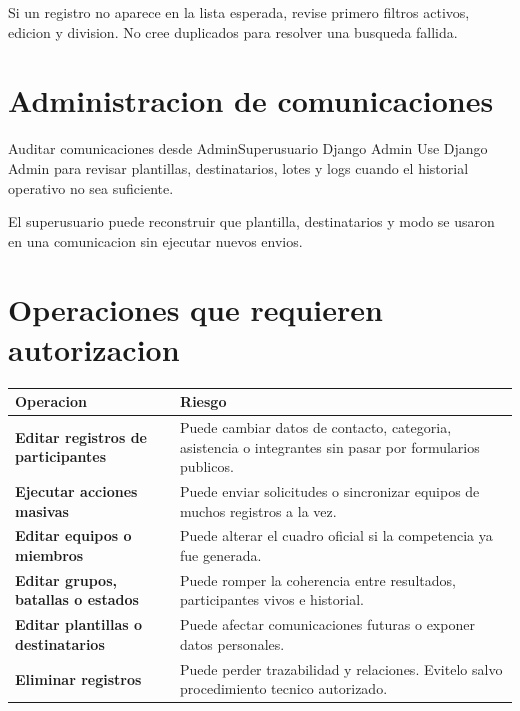 \begin{fallas}
Si un registro no aparece en la lista esperada, revise primero filtros activos, edicion y division. No cree duplicados para resolver una busqueda fallida.
\end{fallas}

\section{Administracion de comunicaciones}

\begin{procedimiento}{Auditar comunicaciones desde Admin}{Superusuario Django Admin}
Use Django Admin para revisar plantillas, destinatarios, lotes y logs cuando el historial operativo no sea suficiente.
\end{procedimiento}


\begin{resultadoesperado}
El superusuario puede reconstruir que plantilla, destinatarios y modo se usaron en una comunicacion sin ejecutar nuevos envios.
\end{resultadoesperado}

\section{Operaciones que requieren autorizacion}

\begin{tabularx}{\linewidth}{>{\bfseries}p{4.1cm}X}
\toprule
Operacion & Riesgo\\
\midrule
Editar registros de participantes & Puede cambiar datos de contacto, categoria, asistencia o integrantes sin pasar por formularios publicos.\\
Ejecutar acciones masivas & Puede enviar solicitudes o sincronizar equipos de muchos registros a la vez.\\
Editar equipos o miembros & Puede alterar el cuadro oficial si la competencia ya fue generada.\\
Editar grupos, batallas o estados & Puede romper la coherencia entre resultados, participantes vivos e historial.\\
Editar plantillas o destinatarios & Puede afectar comunicaciones futuras o exponer datos personales.\\
Eliminar registros & Puede perder trazabilidad y relaciones. Evitelo salvo procedimiento tecnico autorizado.\\
\bottomrule
\end{tabularx}

